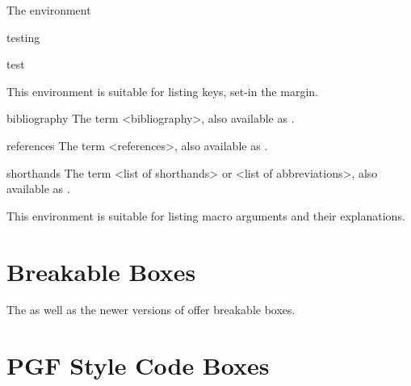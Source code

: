 The environment 
\begin{marglist}
\item[testing]\lorem
\item [test]\lorem
\end{marglist}

This environment is suitable for listing keys, set-in the margin.

\begin{keymarglist}
\item[bibliography] The term <bibliography>, also available as \cmd{\bibname}.
\item[references] The term <references>, also available as .
\item[shorthands] The term <list of shorthands> or <list of abbreviations>, also available as .
\end{keymarglist}


 This environment is suitable for listing macro arguments and their explanations.



\section{Breakable Boxes}

The  as well as the newer versions of 
offer breakable boxes.


\begin{tcolorbox}[enhanced, breakable,
  colback=blue!5!white,colframe=blue!75!black,title=Breakable box,
  watermark color=white,watermark text=\Roman{tcbbreakpart}]
  \lipsum[1-5]
\end{tcolorbox}

\section{PGF Style Code Boxes}

\begin{codeexample}[]
\end{codeexample}





